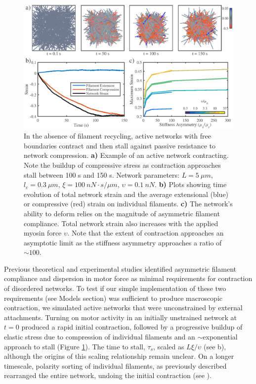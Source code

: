 \documentclass[10pt,letterpaper]{article}
\begin{document}
\begin{figure}[h!]
	\centering
	\includegraphics[width=\hsize]{figures/figure4a}
	\caption{\label{fig:active_con} In the absence of filament recycling, active networks with free boundaries contract and then stall against passive resistance to network compression. \textbf{a)}  Example of an active network contracting. Note the buildup of compressive stress as contraction approaches stall between 100 s and 150 s.  Network parameters: $L=5\: \mu m$, $l_c=0.3\: \mu m$, $\xi=100\: nN\cdot s/\mu m$, $\upsilon=0.1\: nN$.  \textbf{b)} Plots showing time evolution of total network strain and  the average extensional (blue) or compressive (red) strain on individual filaments.   \textbf{c)} The network's ability to deform relies on the magnitude of asymmetric filament compliance.  Total network strain also increases with the applied myosin force $\upsilon$. Note that the extent of contraction approaches an asymptotic limit as the stiffness asymmetry approaches a ratio of $\sim 100$.}
\end{figure}

Previous theoretical and experimental studies\cite{1367-2630-14-3-033037,rheo_2D1,rheo_active} identified asymmetric filament compliance and dispersion in motor force  as minimal requirements for contraction of disordered networks. To test if our simple implementation of these two requirements (see Models section) was sufficient to produce macroscopic contraction, we simulated active networks that were unconstrained by external attachments.  Turning on motor activity in an initially unstrained network at $t=0$ produced a rapid initial contraction, followed by a progressive buildup of elastic stress due to compression of individual filaments and an $\sim$exponential approach to stall (Figure \ref{fig:active_con}). The time to stall, $\tau_s$, scaled as $L\xi/\upsilon$ (see b), although the origins of this scaling relationship remain unclear.  On a longer timescale, polarity sorting of individual filaments, as previously described \cite{Ndlec:1997aa,Surrey1167} rearranged the entire network, undoing the initial contraction (see ).  
\end{document}
